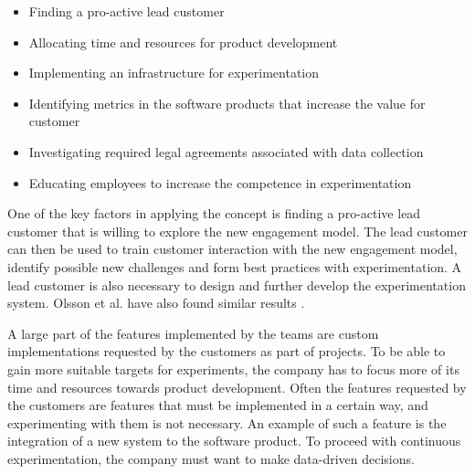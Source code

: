 \documentclass[english]{tktltiki2}
\theoremstyle{definition}
\theoremstyle{remark}
\begin{document}
\begin{itemize}
\item Finding a pro-active lead customer
\item Allocating time and resources for product development
\item Implementing an infrastructure for experimentation
\item Identifying metrics in the software products that increase the value for customer
\item Investigating required legal agreements associated with data collection
\item Educating employees to increase the competence in experimentation
\end{itemize}



One of the key factors in applying the concept is finding a pro-active lead customer that is willing to explore the new engagement model. The lead customer can then be used to train customer interaction with the new engagement model, identify possible new challenges and form best practices with experimentation. A lead customer is also necessary to design and further develop the experimentation system. Olsson et al. have also found similar results \cite{olsson2012climbing}.

A large part of the features implemented by the teams are custom implementations requested by the customers as part of projects. To be able to gain more suitable targets for experiments, the company has to focus more of its time and resources towards product development. Often the features requested by the customers are features that must be implemented in a certain way, and experimenting with them is not necessary. An example of such a feature is the integration of a new system to the software product. To proceed with continuous experimentation, the company must want to make data-driven decisions.
\end{document}
